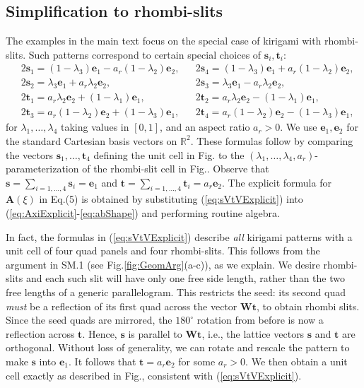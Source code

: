 \documentclass[aps,11pt,tightenlines,notitlepage,superscriptaddress,longbibliography,nofootinbib]{revtex4-1}
\begin{document}
\subsection{Simplification to rhombi-slits} The examples in the main text focus on the special case of kirigami with rhombi-slits. Such patterns correspond to certain special choices of $\mathbf{s}_i,\mathbf{t}_i$:
\begin{equation}
    \begin{aligned}\label{eq:sVtVExplicit}
&2\mathbf{s}_1 = (1-\lambda_3) \mathbf{e}_1 -  a_r (1-\lambda_2) \mathbf{e}_2 , && 2\mathbf{s}_4 =(1-\lambda_3) \mathbf{e}_1 +  a_r (1-\lambda_2) \mathbf{e}_2 , \\
&2\mathbf{s}_2 =  \lambda_3 \mathbf{e}_1 + a_r \lambda_2 \mathbf{e}_2,  &&  2\mathbf{s}_3 =  \lambda_3 \mathbf{e}_1 - a_r \lambda_2 \mathbf{e}_2 , \\
&2\mathbf{t}_1 =  a_r \lambda_2 \mathbf{e}_2 + (1- \lambda_1) \mathbf{e}_1,    && 2\mathbf{t}_2 =  a_r \lambda_2 \mathbf{e}_2 - (1- \lambda_1) \mathbf{e}_1, \\
&2 \mathbf{t}_3 = a_r (1-\lambda_2) \mathbf{e}_2 + (1-\lambda_3) \mathbf{e}_1,   && 2\mathbf{t}_4 = a_r (1-\lambda_2) \mathbf{e}_2 - (1-\lambda_3) \mathbf{e}_1, 
    \end{aligned}
\end{equation}
for $\lambda_1,\ldots, \lambda_4$ taking values in $[0,1]$, and an aspect ratio $a_r >0$. We use $\mathbf{e}_1, \mathbf{e}_2$ for the standard Cartesian basis vectors on $\mathbb{R}^2$. These formulas follow by comparing the vectors $\mathbf{s}_1,\ldots, \mathbf{t}_4$ defining the unit cell in Fig. to the $(\lambda_1, \ldots, \lambda_4,a_r)$-parameterization of the rhombi-slit cell in Fig.. Observe that $\mathbf{s} = \sum_{i=1,\ldots,4} \mathbf{s}_i = \mathbf{e}_1$ and $\mathbf{t} =\sum_{i=1,\ldots,4} \mathbf{t}_i = a_r \mathbf{e}_2$. The explicit formula for $\mathbf{A}(\xi)$ in Eq.\;(5) is obtained by substituting  (\ref{eq:sVtVExplicit}) into (\ref{eq:AxiExplicit}-\ref{eq:abShape}) and performing routine algebra. 

In fact, the formulas in (\ref{eq:sVtVExplicit}) describe \textit{all} kirigami patterns with a unit cell of four quad panels and four rhombi-slits. This follows from the argument in SM.1 (see Fig.\;\ref{fig:GeomArg}(a-c)), as we explain.  We desire rhombi-slits and each such slit will have only one free side length, rather than the two free lengths of a generic parallelogram. This restricts the seed: its second quad \textit{must} be a reflection of its first quad across the vector $\mathbf{W}\mathbf{t}$, to obtain rhombi slits. Since the seed quads are mirrored, the $180^{\circ}$ rotation from before is now a reflection across $\mathbf{t}$. Hence, $\mathbf{s}$ is parallel to $\mathbf{W} \mathbf{t}$, i.e., the lattice vectors $\mathbf{s}$ and $\mathbf{t}$ are orthogonal.  Without loss of generality, we can rotate and rescale the pattern to make $\mathbf{s}$ into $\mathbf{e}_1$. It follows that $\mathbf{t} = a_r \mathbf{e}_2$ for some $a_r >0$. We then obtain a unit cell exactly as described in Fig., consistent with (\ref{eq:sVtVExplicit}). 
\end{document}
